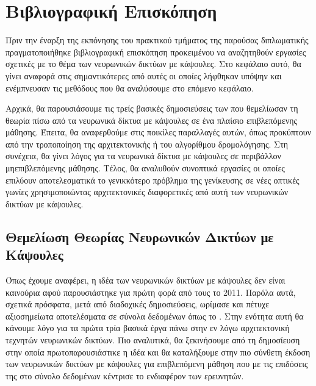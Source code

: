 \chapter{Βιβλιογραφική Επισκόπηση}
\label{chap:related_work}

Πριν την έναρξη της εκπόνησης του πρακτικού τμήματος της παρούσας διπλωματικής πραγματοποιήθηκε βιβλιογραφική επισκόπηση προκειμένου να αναζητηθούν εργασίες σχετικές με το θέμα των νευρωνικών δικτύων με κάψουλες. Στο κεφάλαιο αυτό, θα γίνει αναφορά στις σημαντικότερες από αυτές οι οποίες λήφθηκαν υπόψην και ενέμπνευσαν τις μεθόδους που θα αναλύσουμε στο επόμενο κεφάλαιο.\par

Αρχικά, θα παρουσιάσουμε τις τρείς βασικές δημοσιεύσεις των  που θεμελίωσαν τη θεωρία πίσω από τα νευρωνικά δίκτυα με κάψουλες σε ένα πλαίσιο επιβλεπόμενης μάθησης. Έπειτα, θα αναφερθούμε στις ποικίλες παραλλαγές αυτών, όπως προκύπτουν από την τροποποίηση της αρχιτεκτονικής ή του αλγορίθμου δρομολόγησης. Στη συνέχεια, θα γίνει λόγος για τα νευρωνικά δίκτυα με κάψουλες σε περιβάλλον μη\textendash επιβλεπόμενης μάθησης. Τέλος, θα αναλυθούν συνοπτικά εργασίες οι οποίες επιλύουν αποτελεσματικά το γενικκότερο πρόβλημα της γενίκευσης σε νέες οπτικές γωνίες χρησιμοποιώντας αρχιτεκτονικές διαφορετικές από αυτή των νευρωνικών δικτύων με κάψουλες.\par

\section{Θεμελίωση Θεωρίας Νευρωνικών Δικτύων με Κάψουλες}

Όπως έχουμε αναφέρει, η ιδέα των νευρωνικών δικτύων με κάψουλες δεν είναι καινούρια αφού παρουσιάστηκε για πρώτη φορά από τους  το 2011. Παρόλα αυτά, σχετικά πρόσφατα, μετά από διαδοχικές δημοσιεύσεις, ωρίμασε και πέτυχε αξιοσημείωτα αποτελέσματα σε σύνολα δεδομένων όπως το \cite{sabour2017dynamic}. Στην ενότητα αυτή θα κάνουμε λόγο για τα πρώτα τρία βασικά έργα πάνω στην εν λόγω αρχιτεκτονική τεχνητών νευρωνικών δικτύων. Πιο αναλυτικά, θα ξεκινήσουμε από τη δημοσίευση στην οποία πρωτοπαρουσιάστικε η ιδέα και θα καταλήξουμε στην πιο σύνθετη έκδοση των νευρωνικών δικτύων με κάψουλες για επιβλεπόμενη μάθηση που με τις επιδόσεις της στο σύνολο δεδομένων \cite{lecun2004learning} κέντρισε το ενδιαφέρον των ερευνητών. 

\subsubsection{}

